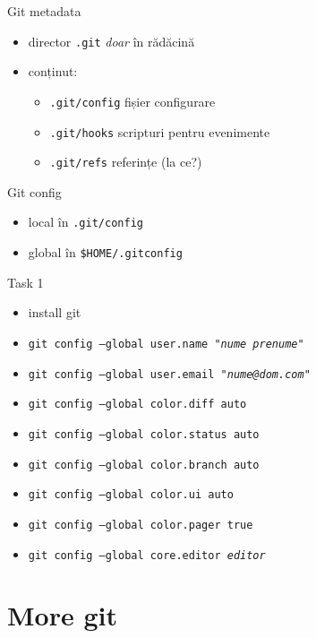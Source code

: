 \documentclass{beamer}
\begin{document}
\begin{frame}{Git metadata}
  \begin{itemize}[<+->]
    \item director \texttt{.git} \textit{doar} în rădăcină
    \item conținut:
      \begin{itemize}
        \item \texttt{.git/config} fișier configurare
        \item \texttt{.git/hooks} scripturi pentru evenimente
        \item \texttt{.git/refs} referințe (la ce?)
      \end{itemize}
  \end{itemize}
\end{frame}

\begin{frame}{Git config}
  \begin{itemize}
    \item local în \texttt{.git/config}
    \item global în \texttt{\$HOME/.gitconfig}
  \end{itemize}
  \pause
  \begin{alertblock}{Task 1}
    \begin{itemize}
      \item install git
      \item \texttt{git config --global user.name "\textit{nume prenume}"}
      \item \texttt{git config --global user.email "\textit{nume@dom.com}"}
      \item \texttt{git config --global color.diff auto}
      \item \texttt{git config --global color.status auto}
      \item \texttt{git config --global color.branch auto}
      \item \texttt{git config --global color.ui auto}
      \item \texttt{git config --global color.pager true}
      \item \texttt{git config --global core.editor \textit{editor}}
    \end{itemize}
  \end{alertblock}
\end{frame}

\section{More git}
\end{document}
